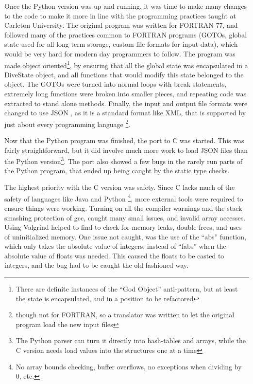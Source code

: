 \documentclass[12pt]{article}
\begin{document}
 Once the Python version was up and running, it was time to make many changes to the code to make it more
in line with the programming practices taught at Carleton University. The original program was written for FORTRAN 77,
and followed many of the practices common to FORTRAN programs (GOTOs, global state used for all long term storage,
custom file formats for input data), which would be very hard for modern day programmers to follow. The program
was made object oriented\footnote{There are definite instances of the ``God Object'' anti-pattern, but at least the state is encapsulated, and in a position to be refactored}, by ensuring that all the global state was encapsulated in a DiveState object, and all functions that would modify this state belonged to the object.
The GOTOs were turned into normal loops with break statements, extremely long functions were broken into smaller
pieces, and repeating code was extracted to stand alone methods. Finally,  the input and output file formats were changed
to use JSON
, as it is a standard format like XML, that is supported by just about every programming language \footnote{though not for FORTRAN, so a translator was written to let the original program load the new input files}.

 Now that the Python program was finished, the port to C
 was started. This was fairly straightforward, but it did involve
much more work to load JSON files than the Python version\footnote{The Python parser can turn it 
directly into hash-tables and arrays, while the C version
needs load values into the structures one at a time}. The port also showed a few bugs in the rarely run parts
of the Python program, that ended up being caught by the static type checks.

The highest priority with the C version was safety. Since C lacks much of the safety of languages
like Java and Python \footnote{No array bounds checking, buffer overflows, no exceptions when dividing by 0, etc.}, more
external tools were required to ensure things were working. Turning on all the compiler warnings and the stack
smashing protection of gcc, caught many small issues, and invalid array accesses. Using Valgrind helped to find
to check for memory leaks, double frees, and uses of uninitialized memory. One issue not caught, was the use
of the ``abs'' function, which only takes the absolute value of integers, instead of ``fabs'' when the absolute value of floats was needed. This caused the floats to be casted to integers, and the bug had to be caught the old fashioned way.
\end{document}
